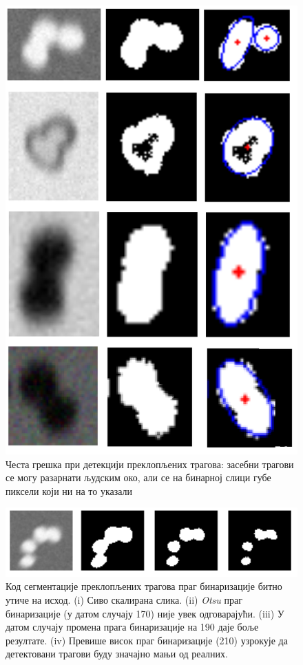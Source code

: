 \documentclass[12pt,a4paper,serbian,oneside]{book}
\begin{document}
\begin{figure}[H]
\begin{center}
\includegraphics[width=150mm]{images/error01.png}
\end{center}
\caption{Честа грешка при детекцији преклопљених трагова: засебни трагови се могу разарнати људским око, али се на бинарној слици губе пиксели који ни на то указали}
\label{fig:error_overlapped}
\end{figure}

\begin{figure}[H]
\begin{center}
\includegraphics[width=150mm]{images/binthresh.png}
\end{center}
\caption{Код сегментације преклопљених трагова праг бинаризације битно утиче на исход. (i) Сиво скалирана слика. (ii) \textit{Otsu}  праг бинаризације (у датом случају 170) није увек одговарајући. (iii) У датом случају промена прага бинаризације на 190 даје боље резултате. (iv) Превише висок праг бинаризације (210) узрокује да детектовани трагови буду значајно мањи од реалних. }
\label{fig:binthresh}
\end{figure}
\end{document}
